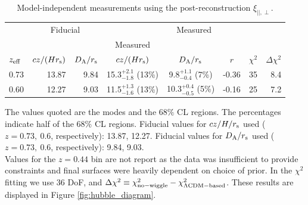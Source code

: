 \documentclass[iop,twocolappendix]{emulateapj}
\newcommand{\red}{\color{red}}
\begin{document}
\begin{table}
\begin{centering}
\caption{Model-independent measurements using the post-reconstruction $\xi_{||,\perp}$.}
\label{tab:hda_wigglez_reconstructed}
\begin{tabular}{ l | r | r | c | c | c | c | r }
\hline
              & \multicolumn{2}{c}{Fiducial} & \multicolumn{5}{c}{Measured} \\  
              &  & & Measured & & & & \\
$z_{\rm eff}$ & $cz/(H r_{\rm s})$ & $D_{\rm A}/r_{\rm s}$  & $cz/(H r_{\rm s})$ & $D_{\rm A}/r_{\rm s}$  & $r$ & $\chi^2$ & $\Delta\chi^2$ \\
\hline
  0.73  & 13.87 & 9.84 & 15.3$^{+2.1}_{-1.8}$ (13\%)  &  9.8$^{+1.1}_{-0.4}$ (7\%)   & -0.36  & 35 & 8.4 \\
  0.60  & 12.27 & 9.03 & 11.5$^{+1.3}_{-1.6}$ (13\%)  & 10.3$^{+0.4}_{-0.5}$ (5\%)   & -0.16  & 25 & 7.2 \\
\end{tabular}

\medskip
The values quoted are the modes and the $68\%$ CL regions. The percentages indicate half of the $68\%$ CL regions.
Fiducial values for $cz/H/r_{\rm s}$ used ($z=0.73,\ 0.6$, respectively): 13.87, 12.27.
Fiducial values for $D_{\rm A}/r_{\rm s}$ used ($z=0.73,\ 0.6$, respectively): 9.84, 9.03.\\
Values for the $z=0.44$ bin are not report as the data was insufficient to provide constraints and final surfaces were heavily dependent on choice of prior.
In the $\chi^2$ fitting we use 36 DoF, and $\Delta\chi^2\equiv \chi^2_{\rm no-wiggle} - \chi^2_{\rm \Lambda CDM-based}$. These results are displayed in Figure \ref{fig:hubble_diagram}. \\
\end{centering}
\end{table}
\end{document}
